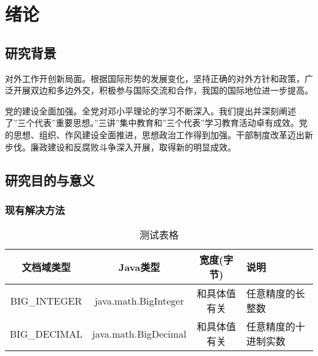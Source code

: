 \documentclass{njuthesis}
\begin{document}
\tableofcontents

\listoffigures

\listoftables

\mainmatter

\chapter{绪论}\label{chapter_introduction}
\section{研究背景}

对外工作开创新局面。根据国际形势的发展变化，坚持正确的对外方针和政策，广泛开展双边和多边外交，积极参与国际交流和合作，我国的国际地位进一步提高。 

党的建设全面加强。全党对邓小平理论的学习不断深入。我们提出并深刻阐述了”三个代表”重要思想。”三讲”集中教育和”三个代表”学习教育活动卓有成效。党的思想、组织、作风建设全面推进，思想政治工作得到加强。干部制度改革迈出新步伐。廉政建设和反腐败斗争深入开展，取得新的明显成效。


\section{研究目的与意义}
\subsection{现有解决方法}
\begin{table}[htbp]
  \centering
  \begin{tabular}{cccp{38mm}}
    \toprule
    \textbf{文档域类型} & \textbf{Java类型} & \textbf{宽度(字节)} & \textbf{说明} \\
    \midrule
    BIG\_INTEGER & java.math.BigInteger & 和具体值有关 & 任意精度的长整数 \\
    BIG\_DECIMAL & java.math.BigDecimal & 和具体值有关 & 任意精度的十进制实数 \\
    \bottomrule
  \end{tabular}
  \caption{测试表格}\label{table:test1}
\end{table}
\end{document}

